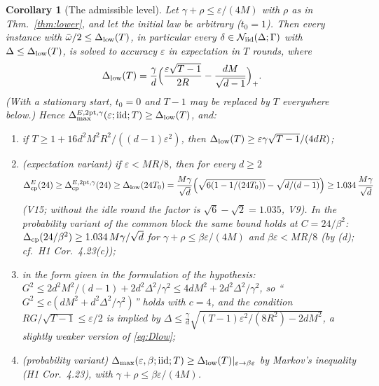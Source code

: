 \documentclass[11pt,a4paper]{article}
\numberwithin{equation}{section}
\newtheorem{corollary}[theorem]{Corollary}
\theoremstyle{definition}
\theoremstyle{remark}
\newcommand{\Dmax}{\Delta_{\max}}\newcommand{\Dcp}{\Delta_{\rm cp}}\newcommand{\Dlow}{\Delta_{\rm low}}
\newcommand{\cN}{\mathcal N}\newcommand{\cA}{\mathcal A}\newcommand{\cG}{\mathcal G}\newcommand{\cF}{\mathcal F}
\newcommand{\wbar}{\bar\omega}\newcommand{\Atwo}{\cA^{\rm 2pt}_\gamma}
\begin{document}
\begin{corollary}[The admissible level]\label{cor:lower}
Let $\gamma+\rho\le\varepsilon/(4M)$ with $\rho$ as in Thm.~\ref{thm:lower}, and let the initial law be arbitrary ($t_0=1$). Then every instance with $\wbar/2\le\Dlow(T)$, in particular every $\delta\in\cN_\iid(\Delta;\Gamma)$ with $\Delta\le\Dlow(T)$, is solved to accuracy $\varepsilon$ in expectation in $T$ rounds, where
\begin{equation}\label{eq:Dlow}
\Dlow(T)=\frac\gamma d\Big(\frac{\varepsilon\sqrt{T-1}}{2R}-\frac{dM}{\sqrt{d-1}}\Big)_+ .
\end{equation}
(With a stationary start, $t_0=0$ and $T-1$ may be replaced by $T$ everywhere below.) Hence $\Dmax^{E,\mathrm{2pt},\gamma}(\varepsilon;\iid;T)\ge\Dlow(T)$, and:
\begin{enumerate}[label=(\alph*)]
\item if $T\ge1+16d^2M^2R^2/((d-1)\varepsilon^2)$, then $\Dlow(T)\ge\varepsilon\gamma\sqrt{T-1}/(4dR)$;
\item (expectation variant) if $\varepsilon<MR/8$, then for every $d\ge2$
\[\Dcp^{E}(24)\ge\Dcp^{E,\mathrm{2pt},\gamma}(24)\ge\Dlow(24T_0)=\frac{M\gamma}{\sqrt d}\Big(\sqrt{6(1-1/(24T_0))}-\sqrt{d/(d-1)}\Big)\ge1.034\,\frac{M\gamma}{\sqrt d}\] (V15; without the idle round the factor is $\sqrt6-\sqrt2=1.035$, V9). In the probability variant of the common block the same bound holds at $C=24/\beta^2$: $\Dcp(24/\beta^2)\ge1.034\,M\gamma/\sqrt d$ for $\gamma+\rho\le\beta\varepsilon/(4M)$ and $\beta\varepsilon<MR/8$ (by (d); cf.\ H1 Cor.~4.23(c));
\item in the form given in the formulation of the hypothesis: $G^2\le2d^2M^2/(d-1)+2d^2\Delta^2/\gamma^2\le4dM^2+2d^2\Delta^2/\gamma^2$, so ``$G^2\le c(dM^2+d^2\Delta^2/\gamma^2)$'' holds with $c=4$, and the condition $RG/\sqrt{T-1}\le\varepsilon/2$ is implied by $\Delta\le\frac\gamma d\sqrt{(T-1)\varepsilon^2/(8R^2)-2dM^2}$, a slightly weaker version of \eqref{eq:Dlow};
\item (probability variant) $\Dmax(\varepsilon,\beta;\iid;T)\ge\Dlow(T)|_{\varepsilon\to\beta\varepsilon}$ by Markov's inequality (H1 Cor.~4.23), with $\gamma+\rho\le\beta\varepsilon/(4M)$.
\end{enumerate}
\end{corollary}
\end{document}
